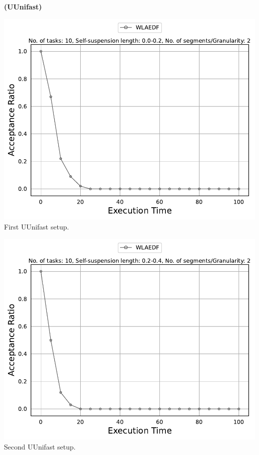 \documentclass[]{article}
\begin{document}
	\begin{minipage}[t]{0.48\linewidth}
		\centering
		\textbf{(UUnifast)}
		\vspace{0.3cm}
		
		\includegraphics[width=\linewidth]{WLAEDF[2][0.0-0.2][10].pdf}
		First UUnifast setup.
		\vspace{0.3cm}
		
		\includegraphics[width=\linewidth]{WLAEDF[2][0.2-0.4][10].pdf}
		Second UUnifast setup.
		\vspace{0.3cm}
		

\end{minipage}
\end{document}
